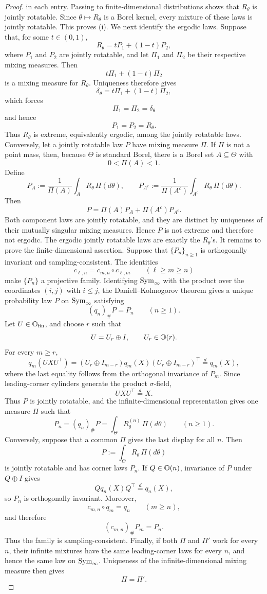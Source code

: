 \begin{proof}
in each entry. Passing to finite-dimensional distributions shows that
\(R_\theta\) is jointly rotatable. Since
\(\theta\mapsto R_\theta\) is a Borel kernel, every mixture of these
laws is jointly rotatable. This proves \textup{(i)}.
We next identify the ergodic laws. Suppose that, for some
\(t\in(0,1)\),
\[
R_\theta
=
tP_1+(1-t)P_2,
\]
where \(P_1\) and \(P_2\) are jointly rotatable, and let
\(\Pi_1\) and \(\Pi_2\) be their respective mixing measures. Then
\[
t\Pi_1+(1-t)\Pi_2
\]
is a mixing measure for \(R_\theta\). Uniqueness therefore gives
\[
\delta_\theta
=
t\Pi_1+(1-t)\Pi_2,
\]
which forces
\[
\Pi_1=\Pi_2=\delta_\theta
\]
and hence
\[
P_1=P_2=R_\theta.
\]
Thus \(R_\theta\) is extreme, equivalently ergodic, among the jointly
rotatable laws.
Conversely, let a jointly rotatable law \(P\) have mixing measure
\(\Pi\). If \(\Pi\) is not a point mass, then, because \(\Theta\) is
standard Borel, there is a Borel set \(A\subseteq\Theta\) with
\[
0<\Pi(A)<1.
\]
Define
\[
P_A
:=
\frac{1}{\Pi(A)}
\int_A R_\theta\,\Pi(d\theta),
\qquad
P_{A^c}
:=
\frac{1}{\Pi(A^c)}
\int_{A^c}R_\theta\,\Pi(d\theta).
\]
Then
\[
P
=
\Pi(A)P_A+\Pi(A^c)P_{A^c}.
\]
Both component laws are jointly rotatable, and they are distinct by
uniqueness of their mutually singular mixing measures. Hence \(P\)
is not extreme and therefore not ergodic. The ergodic jointly
rotatable laws are exactly the \(R_\theta\)'s.
It remains to prove the finite-dimensional assertion. Suppose that
\(\{P_n\}_{n\geq1}\) is orthogonally invariant and
sampling-consistent. The identities
\[
c_{\ell,n}
=
c_{m,n}\circ c_{\ell,m}
\qquad(\ell\geq m\geq n)
\]
make \(\{P_n\}\) a projective family. Identifying
\(\mathrm{Sym}_\infty\) with the product over the coordinates \((i,j)\) with
\(i\leq j\), the Daniell--Kolmogorov theorem gives a unique
probability law \(P\) on \(\mathrm{Sym}_\infty\) satisfying
\[
(q_n)_\#P=P_n
\qquad(n\geq1).
\]
Let \(U\in\mathbb{O}_{\mathrm{fin}}\), and choose \(r\) such that
\[
U=U_r\oplus I,
\qquad
U_r\in\mathbb{O}(r).
\]
For every \(m\geq r\),
\[
q_m(UXU^\top)
=
(U_r\oplus I_{m-r})
q_m(X)
(U_r\oplus I_{m-r})^\top
\overset{d}=q_m(X),
\]
where the last equality follows from the orthogonal invariance of
\(P_m\). Since leading-corner cylinders generate the product
\(\sigma\)-field,
\[
UXU^\top\overset{d}=X.
\]
Thus \(P\) is jointly rotatable, and the infinite-dimensional
representation gives one measure \(\Pi\) such that
\[
P_n
=
(q_n)_\#P
=
\int_\Theta R_\theta^{(n)}\,\Pi(d\theta)
\qquad(n\geq1).
\]
Conversely, suppose that a common \(\Pi\) gives the last display for
all \(n\). Then
\[
P
:=
\int_\Theta R_\theta\,\Pi(d\theta)
\]
is jointly rotatable and has corner laws \(P_n\). If
\(Q\in\mathbb{O}(n)\), invariance of \(P\) under \(Q\oplus I\) gives
\[
Qq_n(X)Q^\top
\overset{d}
=
q_n(X),
\]
so \(P_n\) is orthogonally invariant. Moreover,
\[
c_{m,n}\circ q_m=q_n
\qquad(m\geq n),
\]
and therefore
\[
(c_{m,n})_\#P_m=P_n.
\]
Thus the family is sampling-consistent.
Finally, if both \(\Pi\) and \(\Pi'\) work for every \(n\), their
infinite mixtures have the same leading-corner laws for every \(n\),
and hence the same law on \(\mathrm{Sym}_\infty\). Uniqueness of the
infinite-dimensional mixing measure then gives
\[
\Pi=\Pi'.
\]
\end{proof}

